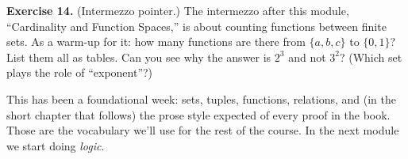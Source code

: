 \documentclass[11pt]{article}
\begin{document}
\bigskip
\noindent\textbf{Exercise 14.}\label{ex:m1:14} (Intermezzo pointer.) The intermezzo after this module, ``Cardinality and Function Spaces,'' is about counting functions between finite sets. As a warm-up for it: how many functions are there from $\{a, b, c\}$ to $\{0, 1\}$? List them all as tables. Can you see why the answer is $2^3$ and not $3^2$? (Which set plays the role of ``exponent''?)

\bigskip
This has been a foundational week: sets, tuples, functions, relations, and (in the short chapter that follows) the prose style expected of every proof in the book. Those are the vocabulary we'll use for the rest of the course. In the next module we start doing \emph{logic}.
\end{document}
